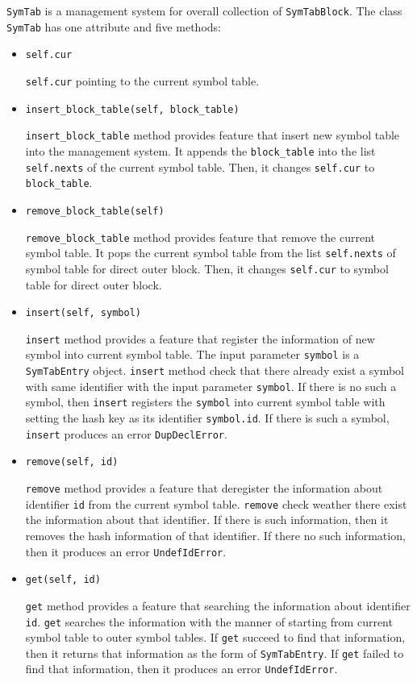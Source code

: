 \documentclass{article}
\newcommand{\code}[1]{\texttt{#1}}
\begin{document}
	\code{SymTab} is a management system for overall collection of \code{SymTabBlock}. The class \code{SymTab} has one attribute and five methods:
	
	\begin{itemize}
		\item \code{self.cur}
		
		\code{self.cur} pointing to the current symbol table.
		
		\item \code{insert\_block\_table(self, block\_table)}
		
		\code{insert\_block\_table} method provides feature that insert new symbol table into the management system. It appends the \code{block\_table} into the list \code{self.nexts} of the current symbol table. Then, it changes \code{self.cur} to \code{block\_table}.
		
		\item \code{remove\_block\_table(self)}
		
		\code{remove\_block\_table} method provides feature that remove the current symbol table. It pops the current symbol table from the list \code{self.nexts} of symbol table for direct outer block. Then, it changes \code{self.cur} to symbol table for direct outer block. 
		
		\item \code{insert(self, symbol)}
		
		\code{insert} method provides a feature that register the information of new symbol into current symbol table. The input parameter \code{symbol} is a \code{SymTabEntry} object. \code{insert} method check that there already exist a symbol with same identifier with the input parameter \code{symbol}. If there is no such a symbol, then \code{insert} registers the \code{symbol} into current symbol table with setting the hash key as its identifier \code{symbol.id}. If there is such a symbol, \code{insert} produces an error \code{DupDeclError}.
		
		\item \code{remove(self, id)}
		
		\code{remove} method provides a feature that deregister the information about identifier \code{id} from the current symbol table. \code{remove} check weather there exist the information about that identifier. If there is such information, then it removes the hash information of that identifier. If there no such information, then it produces an error \code{UndefIdError}.
		
		\item \code{get(self, id)}
		
		\code{get} method provides a feature that searching the information about identifier \code{id}. \code{get} searches the information with the manner of starting from current symbol table to outer symbol tables. If \code{get} succeed to find that information, then it returns that information as the form of \code{SymTabEntry}. If \code{get} failed to find that information, then it produces an error \code{UndefIdError}.
	\end{itemize}
	
\end{document}
